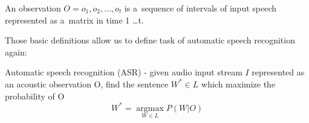 \begin{definition}
	An observation $O = o_1,o_2,\dots,o_t$ is a~sequence of intervals of input speech represented as a~matrix in time 1 \dots  t.
\end{definition}

Those basic definitions allow us to define task of automatic speech recognition again: 

\begin{definition}
	Automatic speech recognition (ASR) - given audio input stream $I$ represented as an acoustic observation O, find the sentence $W^* \in L$ which maximize the probability of O
\begin{equation} 
W^*=\underset{W \in L}{\operatorname{argmax}} P(W|O)
\end{equation}

\end{definition}



